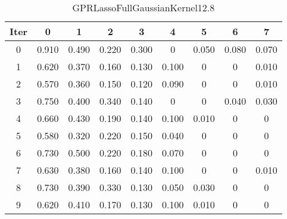 \begin{table}
	\begin{center}
		\begin{tabular}{|c|c|c|c|c|c|c|c|c|}
			\hline
			Iter & 0 & 1 & 2 & 3 & 4 & 5 & 6 & 7 \\
			\hline
			0 & 0.910 & 0.490 & 0.220 & 0.300 & 0 & 0.050 & 0.080 & 0.070 \\
			\hline
			1 & 0.620 & 0.370 & 0.160 & 0.130 & 0.100 & 0 & 0 & 0.010 \\
			\hline
			2 & 0.570 & 0.360 & 0.150 & 0.120 & 0.090 & 0 & 0 & 0.010 \\
			\hline
			3 & 0.750 & 0.400 & 0.340 & 0.140 & 0 & 0 & 0.040 & 0.030 \\
			\hline
			4 & 0.660 & 0.430 & 0.190 & 0.140 & 0.100 & 0.010 & 0 & 0 \\
			\hline
			5 & 0.580 & 0.320 & 0.220 & 0.150 & 0.040 & 0 & 0 & 0 \\
			\hline
			6 & 0.730 & 0.500 & 0.220 & 0.180 & 0.070 & 0 & 0 & 0 \\
			\hline
			7 & 0.630 & 0.380 & 0.160 & 0.140 & 0.100 & 0 & 0 & 0.010 \\
			\hline
			8 & 0.730 & 0.390 & 0.330 & 0.130 & 0.050 & 0.030 & 0 & 0 \\
			\hline
			9 & 0.620 & 0.410 & 0.170 & 0.130 & 0.100 & 0.010 & 0 & 0 \\
			\hline
		\end{tabular}
	\end{center}
	\caption{GPRLassoFullGaussianKernel12.8}
\end{table}
